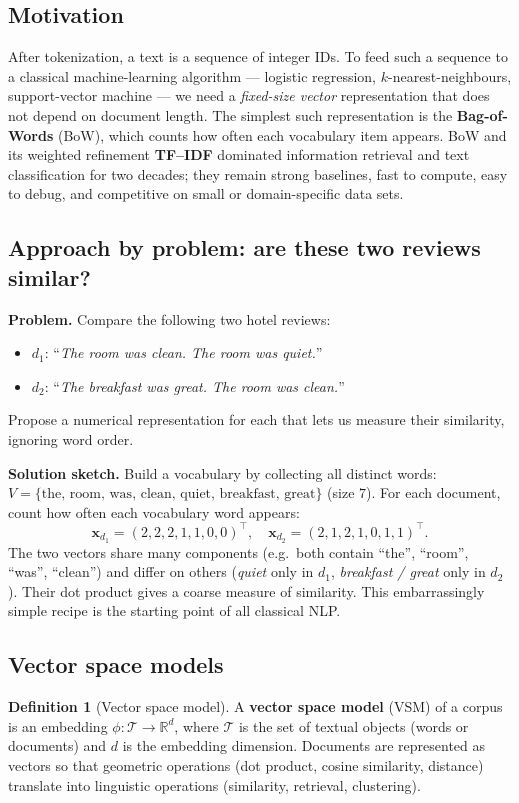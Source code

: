 \documentclass[12pt,a4paper]{report}
\theoremstyle{definition}
\newtheorem{definition}{Definition}[section]
\theoremstyle{remark}
\begin{document}
\subsection{Motivation}
After tokenization, a text is a sequence of integer IDs. To feed such a sequence to a classical machine-learning algorithm --- logistic regression, $k$-nearest-neighbours, support-vector machine --- we need a \emph{fixed-size vector} representation that does not depend on document length. The simplest such representation is the \textbf{Bag-of-Words} (BoW), which counts how often each vocabulary item appears. BoW and its weighted refinement \textbf{TF--IDF} dominated information retrieval and text classification for two decades; they remain strong baselines, fast to compute, easy to debug, and competitive on small or domain-specific data sets.

\subsection{Approach by problem: are these two reviews similar?}
\textbf{Problem.} Compare the following two hotel reviews:
\begin{itemize}
    \item $d_1$: ``\emph{The room was clean. The room was quiet.}''
    \item $d_2$: ``\emph{The breakfast was great. The room was clean.}''
\end{itemize}
Propose a numerical representation for each that lets us measure their similarity, ignoring word order.

\textbf{Solution sketch.} Build a vocabulary by collecting all distinct words: $V = \{\text{the, room, was, clean, quiet, breakfast, great}\}$ (size $7$). For each document, count how often each vocabulary word appears:
\[ \mathbf{x}_{d_1} = (2, 2, 2, 1, 1, 0, 0)^\top, \quad \mathbf{x}_{d_2} = (2, 1, 2, 1, 0, 1, 1)^\top. \]
The two vectors share many components (e.g.\ both contain ``the'', ``room'', ``was'', ``clean'') and differ on others (\emph{quiet} only in $d_1$, \emph{breakfast / great} only in $d_2$). Their dot product gives a coarse measure of similarity. This embarrassingly simple recipe is the starting point of all classical NLP.

\subsection{Vector space models}

\begin{definition}[Vector space model]
A \textbf{vector space model} (VSM) of a corpus is an embedding $\phi : \mathcal{T} \to \mathbb{R}^d$, where $\mathcal{T}$ is the set of textual objects (words or documents) and $d$ is the embedding dimension. Documents are represented as vectors so that geometric operations (dot product, cosine similarity, distance) translate into linguistic operations (similarity, retrieval, clustering).
\end{definition}
\end{document}

